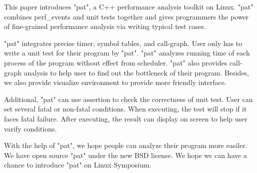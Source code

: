 This paper introduces "pat", a C++ performance analysis toolkit on Linux.
"pat" combines perf_events and unit tests together and gives programmers the power of fine-grained performance analysis via writing typical test cases.

"pat" integrates precise timer, symbol tables, and call-graph. 
User only has to write a unit test for their program by "pat". 
"pat" analyzes running time of each process of the program without effect from scheduler. 
"pat" also provides call-graph analysis to help user to find out the bottleneck of their program. 
Besides, we also provide visualize environment to provide more friendly interface.

Additional, "pat" can use assertion to check the correctness of unit test. 
User can set several fatal or non-fatal conditions.
When executing, the test will stop if it faces fatal failure.
After executing, the result can display on screen to help user varify conditions.

With the help of "pat", we hope people can analyze their program more easiler.
We have open source "pat" under the new BSD license. 
We hope we can have a chance to introduce "pat" on Linux Symposium.
